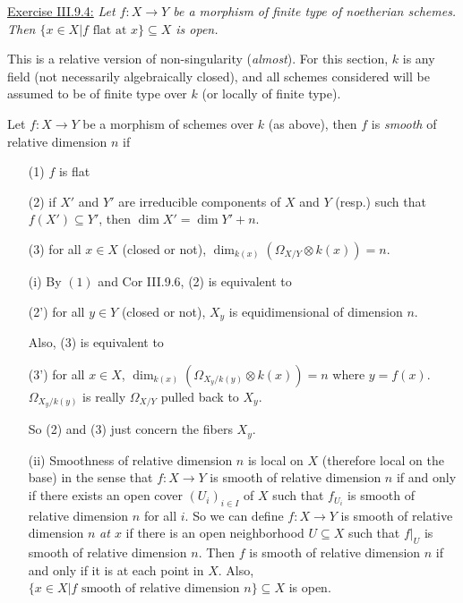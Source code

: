  \underline{Exercise III.9.4:} {\it Let $f:X\to Y$ be a morphism
 of finite type of noetherian schemes.  Then $\{x\in X|f \text{ flat at }x\}\subseteq
 X$ is open.}

 This is a relative version of non-singularity (\emph{almost}).
 For this section, $k$ is any field (not necessarily algebraically
 closed), and all schemes considered will be assumed to be of
 finite type over $k$ (or locally of finite type).

 \begin{definition}
 Let $f:X\to Y$ be a morphism of schemes over $k$ (as above), then
 $f$ is \emph{smooth} of relative dimension $n$ if
 \begin{itemize}
 \item[(1)] $f$ is flat
 \item[(2)] if $X'$ and $Y'$ are irreducible components of $X$ and
 $Y$ (resp.) such that $f(X')\subseteq Y'$, then $\dim X' = \dim
 Y' +n$.
 \item[(3)] for all $x\in X$ (closed or not), $\dim_{k(x)}
 (\Omega_{X/Y}\otimes k(x))=n$.
 \end{itemize}
 \end{definition}

 \begin{remark}
 \begin{itemize}
 \item[]
 \item[(i)] By $(1)$ and Cor III.9.6, (2) is equivalent to

    (2') for all $y\in Y$ (closed or not), $X_y$ is equidimensional
    of dimension $n$.

    Also, (3) is equivalent to

    (3') for all $x\in X$, $\dim_{k(x)} (\Omega_{X_y/k(y)} \otimes
    k(x))=n$ where $y=f(x)$. $\Omega_{X_y/k(y)}$ is really
    $\Omega_{X/Y}$ pulled back to $X_y$.

    So (2) and (3) just concern the fibers $X_y$.
 \item[(ii)] Smoothness of relative dimension $n$ is local on $X$
 (therefore local on the base) in the sense that $f:X\to Y$ is
 smooth of relative dimension $n$ if and only if there exists an
 open cover $(U_i)_{i\in I}$ of $X$ such that $f_{U_i}$ is smooth
 of relative dimension $n$ for all $i$.  So we can define $f:X\to
 Y$ is smooth of relative dimension $n$ \emph{at $x$} if there is
 an open neighborhood $U\subseteq X$ such that $f|_U$ is smooth of
 relative dimension $n$.  Then $f$ is smooth of relative dimension
 $n$ if and only if it is at each point in $X$.  Also, $\{x\in
 X|\text{$f$ smooth of relative dimension $n$}\}\subseteq X$ is
 open.
 \end{itemize}
 \end{remark}

